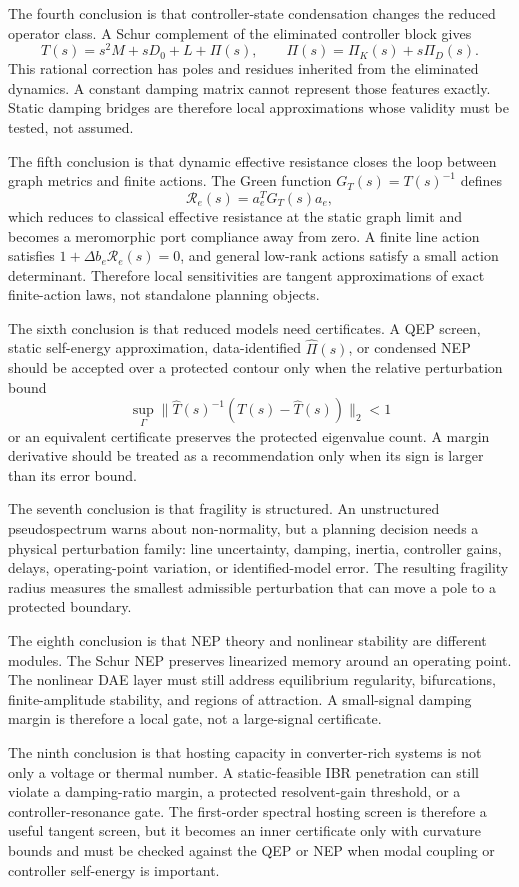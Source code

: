 The fourth conclusion is that controller-state condensation changes the reduced
operator class. A Schur complement of the eliminated controller block gives
\[
  T(s)=s^2M+sD_0+L+\Pi(s),
  \qquad
  \Pi(s)=\Pi_K(s)+s\Pi_D(s).
\]
This rational correction has poles and residues inherited from the eliminated
dynamics. A constant damping matrix cannot represent those features exactly.
Static damping bridges are therefore local approximations whose validity must
be tested, not assumed.

The fifth conclusion is that dynamic effective resistance closes the loop
between graph metrics and finite actions. The Green function
\(G_T(s)=T(s)^{-1}\) defines
\[
  \mathcal R_e(s)=a_e^TG_T(s)a_e ,
\]
which reduces to classical effective resistance at the static graph limit and
becomes a meromorphic port compliance away from zero. A finite line action
satisfies \(1+\Delta b_e\mathcal R_e(s)=0\), and general low-rank actions
satisfy a small action determinant. Therefore local sensitivities are tangent
approximations of exact finite-action laws, not standalone planning objects.

The sixth conclusion is that reduced models need certificates. A QEP screen,
static self-energy approximation, data-identified \(\widehat\Pi(s)\), or
condensed NEP should be accepted over a protected contour only when the
relative perturbation bound
\[
  \sup_{\Gamma}\|\widehat T(s)^{-1}(T(s)-\widehat T(s))\|_2<1
\]
or an equivalent certificate preserves the protected eigenvalue count. A
margin derivative should be treated as a recommendation only when its sign is
larger than its error bound.

The seventh conclusion is that fragility is structured. An unstructured
pseudospectrum warns about non-normality, but a planning decision needs a
physical perturbation family: line uncertainty, damping, inertia, controller
gains, delays, operating-point variation, or identified-model error. The
resulting fragility radius measures the smallest admissible perturbation that
can move a pole to a protected boundary.

The eighth conclusion is that NEP theory and nonlinear stability are different
modules. The Schur NEP preserves linearized memory around an operating point.
The nonlinear DAE layer must still address equilibrium regularity,
bifurcations, finite-amplitude stability, and regions of attraction. A
small-signal damping margin is therefore a local gate, not a large-signal
certificate.

The ninth conclusion is that hosting capacity in converter-rich systems is
not only a voltage or thermal number. A static-feasible IBR penetration can
still violate a damping-ratio margin, a protected resolvent-gain threshold, or
a controller-resonance gate. The first-order spectral hosting screen is
therefore a useful tangent screen, but it becomes an inner certificate only with
curvature bounds and must be checked against the QEP or NEP when modal coupling
or controller self-energy is important.

